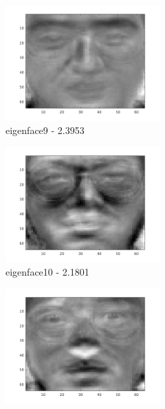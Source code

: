 \documentclass[a4paper]{article}
\begin{document}
\begin{figure}[H]
    \begin{subfigure}[c]{0.24\textwidth}
        \centering
        \includegraphics[width=0.65\textwidth]{images/ex2_x9.png}
        \caption{eigenface9 - 2.3953}
        \label{subfig:ex2_x9}
    \end{subfigure}
    \begin{subfigure}[c]{0.24\textwidth}
        \centering
        \includegraphics[width=0.65\textwidth]{images/ex2_x10.png}
        \caption{eigenface10 - 2.1801}
        \label{subfig:ex2_x10}
    \end{subfigure}
    \begin{subfigure}[c]{0.24\textwidth}
        \centering
        \includegraphics[width=0.65\textwidth]{images/ex2_x11.png}

\end{subfigure}
\end{figure}
\end{document}
